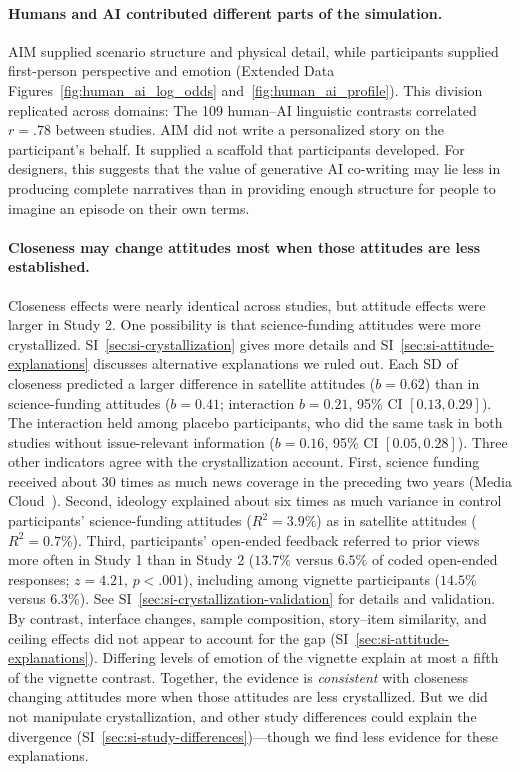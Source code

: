 \documentclass[11pt]{article}
\begin{document}
\paragraph{Humans and AI contributed different parts of the simulation.} AIM supplied scenario structure and physical detail, while participants supplied first-person perspective and emotion (Extended Data Figures~\ref{fig:human_ai_log_odds} and~\ref{fig:human_ai_profile}). This division replicated across domains: The 109 human--AI linguistic contrasts correlated $r = .78$ between studies. AIM did not write a personalized story on the participant's behalf. It supplied a scaffold that participants developed. For designers, this suggests that the value of generative AI co-writing may lie less in producing complete narratives than in providing enough structure for people to imagine an episode on their own terms.

\paragraph{Closeness may change attitudes most when those attitudes are less established.} Closeness effects were nearly identical across studies, but attitude effects were larger in Study 2. One possibility is that science-funding attitudes were more crystallized. SI~\autoref{sec:si-crystallization} gives more details and SI~\autoref{sec:si-attitude-explanations} discusses alternative explanations we ruled out. Each SD of closeness predicted a larger difference in satellite attitudes ($b=0.62$) than in science-funding attitudes ($b=0.41$; interaction $b=0.21$, 95\% CI $[0.13,0.29]$). The interaction held among placebo participants, who did the same task in both studies without issue-relevant information ($b=0.16$, 95\% CI $[0.05,0.28]$). Three other indicators agree with the crystallization account. First, science funding received about 30 times as much news coverage in the preceding two years (Media Cloud~\citep{roberts_media_2021}). Second, ideology explained about six times as much variance in control participants' science-funding attitudes ($R^2=3.9\%$) as in satellite attitudes ($R^2=0.7\%$). Third, participants' open-ended feedback referred to prior views more often in Study 1 than in Study 2 ($13.7\%$ versus $6.5\%$ of coded open-ended responses; $z=4.21$, $p<.001$), including among vignette participants ($14.5\%$ versus $6.3\%$). See SI~\autoref{sec:si-crystallization-validation} for details and validation. By contrast, interface changes, sample composition, story--item similarity, and ceiling effects did not appear to account for the gap (SI~\autoref{sec:si-attitude-explanations}). Differing levels of emotion of the vignette explain at most a fifth of the vignette contrast. Together, the evidence is \textit{consistent} with closeness changing attitudes more when those attitudes are less crystallized. But we did not manipulate crystallization, and other study differences could explain the divergence (SI~\autoref{sec:si-study-differences})---though we find less evidence for these explanations.
\end{document}
